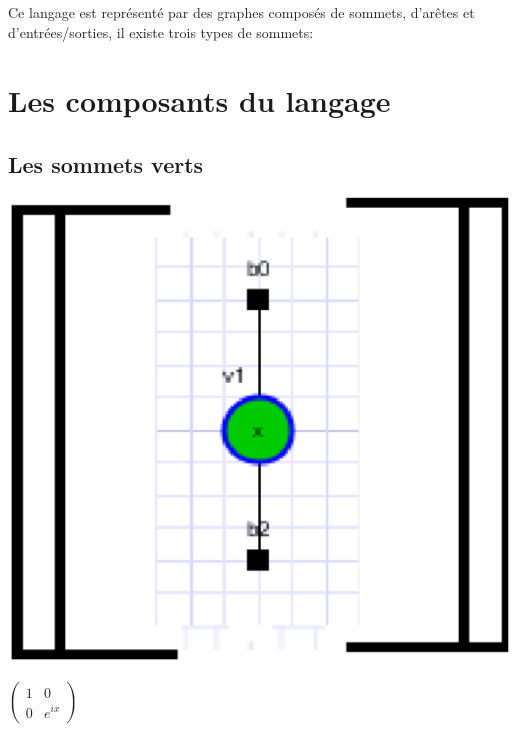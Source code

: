 \documentclass[a4paper,oneside]{book}
\begin{document}
Ce langage est représenté par des graphes composés de sommets, d'arêtes et d'entrées/sorties, il existe trois types de sommets:

\newpage

\section{Les composants du langage}
\subsection{Les sommets verts}

\begin{center}
\hspace{1cm}
\begin{minipage}[c]{0.25\textwidth}
\includegraphics[scale=0.25]{IMG/sommetVert.eps}
\end{minipage}
\hspace{2cm}
\begin{minipage}[c]{0.25\textwidth}
$
\begin{pmatrix}
1 & 0 \\
0 & e^{ix}
\end{pmatrix}
$
\end{minipage}
\label{sommetVert}
\end{center}
 
\end{document}
